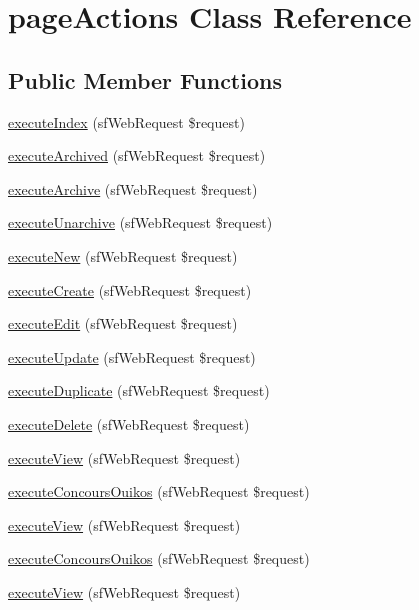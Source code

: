 \hypertarget{classpage_actions}{\section{page\-Actions Class Reference}
\label{classpage_actions}
}
\subsection*{Public Member Functions}
\begin{DoxyCompactItemize}
\item 
\hyperlink{classpage_actions_a948cc911eb1d9f77990be54af3b2080f}{execute\-Index} (sf\-Web\-Request \$request)
\item 
\hyperlink{classpage_actions_a34384867834470ecb17dc76606bd024c}{execute\-Archived} (sf\-Web\-Request \$request)
\item 
\hyperlink{classpage_actions_a125bc3ae7606704e382437dac621c274}{execute\-Archive} (sf\-Web\-Request \$request)
\item 
\hyperlink{classpage_actions_a53fe4f1b6e71dc44c31636b9fa5e422b}{execute\-Unarchive} (sf\-Web\-Request \$request)
\item 
\hyperlink{classpage_actions_a0ffbea56560c6c633dae68ec22aff21c}{execute\-New} (sf\-Web\-Request \$request)
\item 
\hyperlink{classpage_actions_a75837617743fb64dca82d8133b2c662a}{execute\-Create} (sf\-Web\-Request \$request)
\item 
\hyperlink{classpage_actions_af4d8fedd4b28f3398826a1bb8fa54394}{execute\-Edit} (sf\-Web\-Request \$request)
\item 
\hyperlink{classpage_actions_af7b4f51862add3c2ebb54efc136a0840}{execute\-Update} (sf\-Web\-Request \$request)
\item 
\hyperlink{classpage_actions_a5dcc63e52a13d45abab9f89c6c8733d4}{execute\-Duplicate} (sf\-Web\-Request \$request)
\item 
\hyperlink{classpage_actions_a52b5b11b11a0070dd2662257520c045a}{execute\-Delete} (sf\-Web\-Request \$request)
\item 
\hyperlink{classpage_actions_ad61d212fa3f7e8cb4190700a8a670606}{execute\-View} (sf\-Web\-Request \$request)
\item 
\hyperlink{classpage_actions_a5f7b0d8a41a212ec0dacc897368c05c4}{execute\-Concours\-Ouikos} (sf\-Web\-Request \$request)
\item 
\hyperlink{classpage_actions_ad61d212fa3f7e8cb4190700a8a670606}{execute\-View} (sf\-Web\-Request \$request)
\item 
\hyperlink{classpage_actions_a5f7b0d8a41a212ec0dacc897368c05c4}{execute\-Concours\-Ouikos} (sf\-Web\-Request \$request)
\item 
\hyperlink{classpage_actions_ad61d212fa3f7e8cb4190700a8a670606}{execute\-View} (sf\-Web\-Request \$request)
\end{DoxyCompactItemize}
